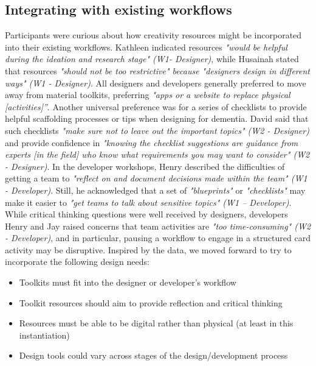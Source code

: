 \subsection{Integrating with existing workflows}
Participants were curious about how creativity resources might be incorporated into their existing workflows. Kathleen indicated resources \textit{"would be helpful during the ideation and research stage" (W1- Designer)}, while Husainah stated that resources \textit{"should not be too restrictive" because "designers design in different ways" (W1 - Designer)}. All designers and developers generally preferred to move away from material toolkits, preferring \textit{"apps or a website to replace physical [activities]”}. 
Another universal preference was for a series of checklists to provide helpful scaffolding processes or tips when designing for dementia. David said that such checklists \textit{"make sure not to leave out the important topics" (W2 - Designer)} and provide confidence in \textit{"knowing the checklist suggestions are guidance from experts [in the field] who know what requirements you may want to consider" (W2 - Designer)}. In the developer workshops, Henry described the difficulties of getting a team to \textit{"reflect on and document decisions made within the team" (W1 - Developer)}. Still, he acknowledged that a set of \textit{"blueprints"} or \textit{"checklists"} may make it easier to \textit{"get teams to talk about sensitive topics" (W1 – Developer)}. 
While critical thinking questions were well received by designers, developers Henry and Jay raised concerns that team activities are \textit{"too time-consuming" (W2 - Developer)}, and in particular, pausing a workflow to engage in a structured card activity may be disruptive. Inspired by the data, we moved forward to try to incorporate the following design needs:
\begin{itemize}
\item Toolkits must fit into the designer or developer’s workflow	
\item Toolkit resources should aim to provide reflection and critical thinking
\item Resources must be able to be digital rather than physical (at least in this instantiation)
\item Design tools could vary across stages of the design/development process 
\end{itemize}

